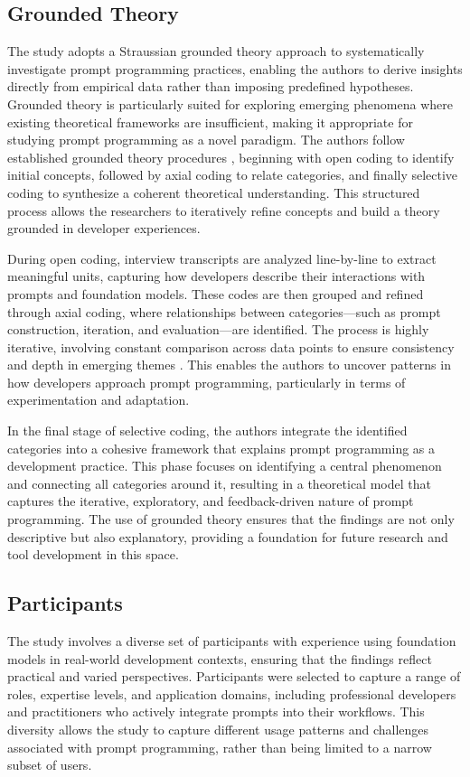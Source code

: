 \subsection{Grounded Theory}
The study adopts a Straussian grounded theory approach to systematically investigate prompt programming practices, enabling the authors to derive insights directly from empirical data rather than imposing predefined hypotheses. Grounded theory is particularly suited for exploring emerging phenomena where existing theoretical frameworks are insufficient, making it appropriate for studying prompt programming as a novel paradigm. The authors follow established grounded theory procedures \cite{Strauss1998Basics}, beginning with open coding to identify initial concepts, followed by axial coding to relate categories, and finally selective coding to synthesize a coherent theoretical understanding. This structured process allows the researchers to iteratively refine concepts and build a theory grounded in developer experiences.

During open coding, interview transcripts are analyzed line-by-line to extract meaningful units, capturing how developers describe their interactions with prompts and foundation models. These codes are then grouped and refined through axial coding, where relationships between categories—such as prompt construction, iteration, and evaluation—are identified. The process is highly iterative, involving constant comparison across data points to ensure consistency and depth in emerging themes \cite{Strauss1998Basics}. This enables the authors to uncover patterns in how developers approach prompt programming, particularly in terms of experimentation and adaptation.

In the final stage of selective coding, the authors integrate the identified categories into a cohesive framework that explains prompt programming as a development practice. This phase focuses on identifying a central phenomenon and connecting all categories around it, resulting in a theoretical model that captures the iterative, exploratory, and feedback-driven nature of prompt programming. The use of grounded theory ensures that the findings are not only descriptive but also explanatory, providing a foundation for future research and tool development in this space.

\subsection{Participants}
The study involves a diverse set of participants with experience using foundation models in real-world development contexts, ensuring that the findings reflect practical and varied perspectives. Participants were selected to capture a range of roles, expertise levels, and application domains, including professional developers and practitioners who actively integrate prompts into their workflows. This diversity allows the study to capture different usage patterns and challenges associated with prompt programming, rather than being limited to a narrow subset of users.

